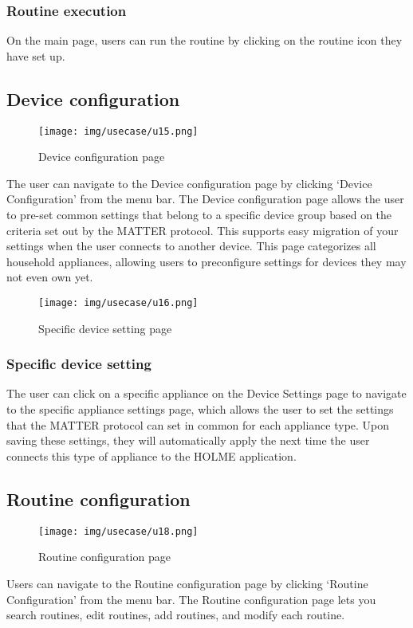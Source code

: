 \documentclass[conference]{IEEEtran}
\begin{document}
\subsubsection{Routine execution}
On the main page, users can run the routine by clicking on the routine icon they have set up.
\vspace{1cm}
\subsection{Device configuration}
\begin{figure}[h]
\centering
\texttt{[image: img/usecase/u15.png]}
\caption{Device configuration page}
\end{figure}
The user can navigate to the Device configuration page by clicking `Device Configuration' from the menu bar. The Device configuration page allows the user to pre-set common settings that belong to a specific device group based on the criteria set out by the MATTER protocol. This supports easy migration of your settings when the user connects to another device. This page categorizes all household appliances, allowing users to preconfigure settings for devices they may not even own yet.
\clearpage

\begin{figure}[h!]
\centering
\texttt{[image: img/usecase/u16.png]}
\caption{Specific device setting page}
\end{figure}
\subsubsection{Specific device setting}
The user can click on a specific appliance on the Device Settings page to navigate to the specific appliance settings page, which allows the user to set the settings that the MATTER protocol can set in common for each appliance type. Upon saving these settings, they will automatically apply the next time the user connects this type of appliance to the HOLME application.
\vspace{0.5cm}

\subsection{Routine configuration}
\begin{figure}[h]
\centering
\texttt{[image: img/usecase/u18.png]}
\caption{Routine configuration page}
\end{figure}
Users can navigate to the Routine configuration page by clicking `Routine Configuration' from the menu bar. The Routine configuration page lets you search routines, edit routines, add routines, and modify each routine.
\end{document}
